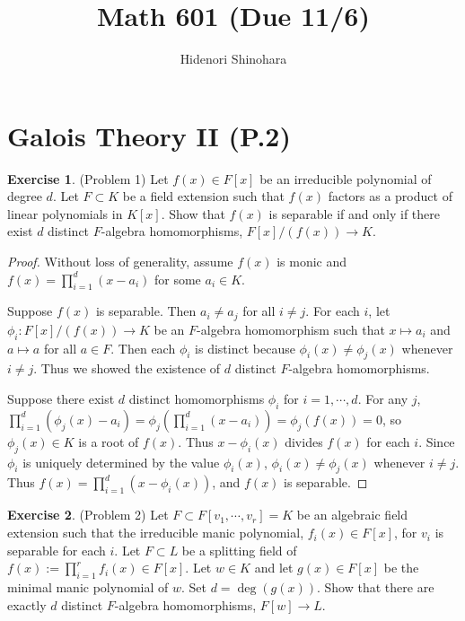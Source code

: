 \documentclass[12pt, psamsfonts]{amsart}
\theoremstyle{definition}
\newtheorem*{exer}{Exercise}
\theoremstyle{remark}
\numberwithin{equation}{section}
\begin{document}
\title{Math 601 (Due 11/6)}
\author{Hidenori Shinohara}
\maketitle

\tableofcontents

\section{Galois Theory II (P.2)}

\begin{exer}{(Problem 1)}
  Let $f(x) \in F[x]$ be an irreducible polynomial of degree $d$.
  Let $F \subset K$ be a field extension such that $f(x)$ factors as a product of linear polynomials in $K[x]$.
  Show that $f(x)$ is separable if and only if there exist $d$ distinct $F$-algebra homomorphisms, $F[x]/(f(x)) \rightarrow K$.
\end{exer}

\begin{proof}
  Without loss of generality, assume $f(x)$ is monic and $f(x) = \prod_{i=1}^{d} (x - a_i)$ for some $a_i \in K$.

  Suppose $f(x)$ is separable.
  Then $a_i \ne a_j$ for all $i \ne j$.
  For each $i$, let $\phi_i: F[x]/(f(x)) \rightarrow K$ be an $F$-algebra homomorphism such that $x \mapsto a_i$ and $a \mapsto a$ for all $a \in F$.
  Then each $\phi_i$ is distinct because $\phi_i(x) \ne \phi_j(x)$ whenever $i \ne j$.
  Thus we showed the existence of $d$ distinct $F$-algebra homomorphisms.

  Suppose there exist $d$ distinct homomorphisms $\phi_i$ for $i = 1, \cdots, d$.
  For any $j$, $\prod_{i=1}^{d}(\phi_j(x) - a_i) = \phi_j(\prod_{i=1}^{d}(x - a_i)) = \phi_j(f(x)) = 0$, so $\phi_j(x) \in K$ is a root of $f(x)$.
  Thus $x - \phi_i(x)$ divides $f(x)$ for each $i$.
  Since $\phi_i$ is uniquely determined by the value $\phi_i(x)$, $\phi_i(x) \ne \phi_j(x)$ whenever $i \ne j$.
  Thus $f(x) = \prod_{i=1}^{d}(x - \phi_i(x))$, and $f(x)$ is separable.
\end{proof}

\begin{exer}{(Problem 2)}
  Let $F \subset F[v_1, \cdots, v_r] = K$ be an algebraic field extension such that the irreducible manic polynomial, $f_i(x) \in F[x]$, for $v_i$ is separable for each $i$.
  Let $F \subset L$ be a splitting field of $f(x) := \prod_{i=1}^r f_i(x) \in F[x]$.
  Let $w \in K$ and let $g(x) \in F[x]$ be the minimal manic polynomial of $w$.
  Set $d = \deg(g(x))$.
  Show that there are exactly $d$ distinct $F$-algebra homomorphisms, $F[w] \rightarrow L$.
\end{exer}
\end{document}
